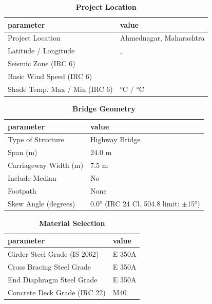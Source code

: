 \documentclass[12pt,a4paper]{report}
\numberwithin{table}{chapter}
\numberwithin{figure}{chapter}
\begin{document}
\begin{table}[H]
\caption{\textbf{Project Location}}
\label{subsec:project-location}
\begin{tabular}{|L{5.5cm}|L{8.5cm}|}
\hline
\textbf{parameter} & \textbf{value} \\
\hline
\textnormal{Project Location} & Ahmednagar, Maharashtra \\
\hline
\textnormal{Latitude / Longitude} & ,  \\
\hline
\textnormal{Seismic Zone (IRC 6)} &  \\
\hline
\textnormal{Basic Wind Speed (IRC 6)} &  \\
\hline
\textnormal{Shade Temp. Max / Min (IRC 6)} &  °C /  °C \\
\hline
\end{tabular}
\vspace{0.4cm}
\end{table}

\begin{table}[H]
\caption{\textbf{Bridge Geometry}}
\label{subsec:bridge-geometry}
\begin{tabular}{|L{5.5cm}|L{8.5cm}|}
\hline
\textbf{parameter} & \textbf{value} \\
\hline
\textnormal{Type of Structure} & Highway Bridge \\
\hline
\textnormal{Span (m)} & 24.0 m \\
\hline
\textnormal{Carriageway Width (m)} & 7.5 m \\
\hline
\textnormal{Include Median} & No \\
\hline
\textnormal{Footpath} & None \\
\hline
\textnormal{Skew Angle (degrees)} & 0.0° (IRC 24 Cl. 504.8 limit: $\pm$15°) \\
\hline
\end{tabular}
\end{table}
\vspace{0.4cm}

\begin{table}[H]
\caption{\textbf{Material Selection}}
\label{subsec:material}
\begin{tabular}{|L{5.5cm}|L{8.5cm}|}
\hline
\textbf{parameter} & \textbf{value} \\
\hline
\textnormal{Girder Steel Grade (IS 2062)} & E 350A \\
\hline
\textnormal{Cross Bracing Steel Grade} & E 350A \\
\hline
\textnormal{End Diaphragm Steel Grade} & E 350A \\
\hline
\textnormal{Concrete Deck Grade (IRC 22)} & M40 \\
\hline
\end{tabular}
\end{table}
\vspace{0.4cm}
\end{document}
